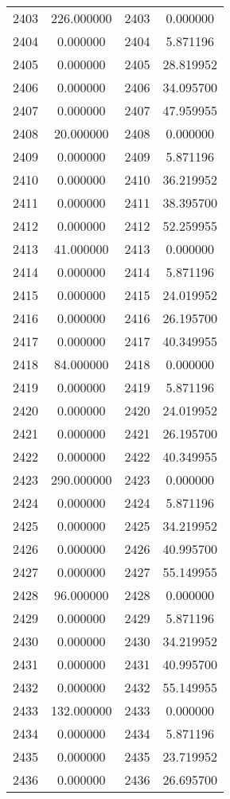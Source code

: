 \documentclass[12pt]{article}
\begin{document}
\begin{longtable}{@{}cccc@{}}
2403 & 226.000000 & 2403 & 0.000000 \\
2404 & 0.000000 & 2404 & 5.871196 \\
2405 & 0.000000 & 2405 & 28.819952 \\
2406 & 0.000000 & 2406 & 34.095700 \\
2407 & 0.000000 & 2407 & 47.959955 \\
2408 & 20.000000 & 2408 & 0.000000 \\
2409 & 0.000000 & 2409 & 5.871196 \\
2410 & 0.000000 & 2410 & 36.219952 \\
2411 & 0.000000 & 2411 & 38.395700 \\
2412 & 0.000000 & 2412 & 52.259955 \\
2413 & 41.000000 & 2413 & 0.000000 \\
2414 & 0.000000 & 2414 & 5.871196 \\
2415 & 0.000000 & 2415 & 24.019952 \\
2416 & 0.000000 & 2416 & 26.195700 \\
2417 & 0.000000 & 2417 & 40.349955 \\
2418 & 84.000000 & 2418 & 0.000000 \\
2419 & 0.000000 & 2419 & 5.871196 \\
2420 & 0.000000 & 2420 & 24.019952 \\
2421 & 0.000000 & 2421 & 26.195700 \\
2422 & 0.000000 & 2422 & 40.349955 \\
2423 & 290.000000 & 2423 & 0.000000 \\
2424 & 0.000000 & 2424 & 5.871196 \\
2425 & 0.000000 & 2425 & 34.219952 \\
2426 & 0.000000 & 2426 & 40.995700 \\
2427 & 0.000000 & 2427 & 55.149955 \\
2428 & 96.000000 & 2428 & 0.000000 \\
2429 & 0.000000 & 2429 & 5.871196 \\
2430 & 0.000000 & 2430 & 34.219952 \\
2431 & 0.000000 & 2431 & 40.995700 \\
2432 & 0.000000 & 2432 & 55.149955 \\
2433 & 132.000000 & 2433 & 0.000000 \\
2434 & 0.000000 & 2434 & 5.871196 \\
2435 & 0.000000 & 2435 & 23.719952 \\
2436 & 0.000000 & 2436 & 26.695700 \\

\end{longtable}
\end{document}
